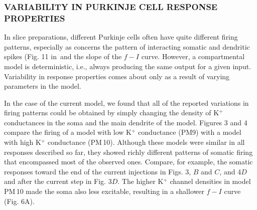 \documentclass[12pt]{article}
\begin{document}
\subsubsection*{VARIABILITY IN PURKINJE CELL RESPONSE PROPERTIES}

In slice preparations, different Purkinje cells often have quite different firing patterns, especially as concerns the pattern of interacting somatic and dendritic spikes (Fig. 11 in\,\cite{R:1980ly} and the slope of the $f-I$ curve. However, a compartmental model is deterministic, i.e., always producing the same output for a given input. Variability in response properties comes about only as a result of varying parameters in the model.

In the case of the current model, we found that all of the reported variations in firing patterns could be obtained by simply changing the density of K$^+$ conductances in the soma and the main dendrite of the model. Figures 3 and 4 compare the firing of a model with low K$^+$ conductance (PM9) with a model with high K$^+$ conductance (PM\,10). Although these models were similar in all responses described so far, they showed richly different patterns of somatic firing that encompassed most of the observed ones. Compare, for example, the somatic responses toward the end of the current injections in Figs. 3, $B$ and $C$, and 4$D$ and after the current step in Fig. 3$D$. The higher K$^+$ channel densities in model PM\,10 made the soma also less excitable, resulting in a shallower $f-I$ curve (Fig. 6A).



\end{document}
